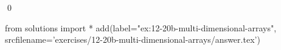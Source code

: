 
\begin{ex} 
  \label{ex:12-20b-multi-dimensional-arrays}
  
  \qed
\end{ex} 
\begin{python0}
from solutions import *
add(label="ex:12-20b-multi-dimensional-arrays",
    srcfilename='exercises/12-20b-multi-dimensional-arrays/answer.tex') 
\end{python0}
